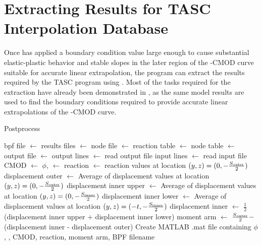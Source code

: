 \FloatBarrier
\section{Extracting Results for TASC Interpolation Database}
\label{sec:postprocess}

Once  has applied a boundary condition value large enough to cause substantial elastic-plastic behavior and stable slopes in the later region of the \J-CMOD curve suitable for accurate linear extrapolation,
the program can extract the results required by the TASC program using .
Most of the tasks required for the extraction have already been demonstrated in , as the same model results are used to find the boundary conditions required to provide accurate linear extrapolations of the \J-CMOD curve.

\begin{algorithm}[tbp]
  \caption{Postprocess}
  \label{alg:postprocess}
  \begin{algorithmic}
    \State bpf file $\gets$ 
    \State results files $\gets$ 
    \State {}
    \State node file $\gets$ 
    \State reaction table $\gets$ 
    \State node table $\gets$ 
    \State output file $\gets$ 
    \State output lines $\gets$ read output file
    \State input lines $\gets$ read input file
	\State CMOD $\gets$ 
	\State $\phi$, \J $\gets$ 
	\State reaction $\gets$ reaction values at location $(y, z) = (0, -\frac{S_\textnormal{outer}}{2})$
	\State {}
	\State displacement outer $\gets$ Average of displacement values at location $(y, z) = (0, -\frac{S_\textnormal{outer}}{2})$
	\State {}
	\State displacement inner upper $\gets$ Average of displacement values at location $(y, z) = (0, -\frac{S_\textnormal{inner}}{2})$
	\State displacement inner lower $\gets$ Average of displacement values at location $(y, z) = (-t, -\frac{S_\textnormal{inner}}{2})$
	\State {}
	\State displacement inner $\gets$ $\frac{1}{2}$(displacement inner upper + displacement inner lower)
	\State moment arm $\gets$ $\frac{S_\textnormal{outer}}{2} -$ (displacement inner - displacement outer)
	\State {}
	\State Create MATLAB .mat file containing $\phi$, \J, CMOD, reaction, moment arm, BPF filename
    \EndProcedure
  \end{algorithmic}
\end{algorithm}

